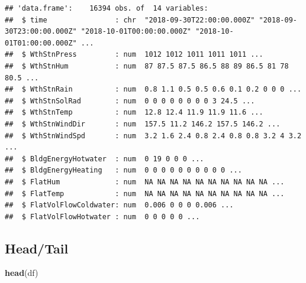 \documentclass[
]{book}
\newenvironment{Shaded}{\begin{snugshade}}{\end{snugshade}}
\newcommand{\KeywordTok}[1]{\textcolor[rgb]{0.13,0.29,0.53}{\textbf{#1}}}
\newcommand{\NormalTok}[1]{#1}
\begin{document}
\begin{verbatim}
## 'data.frame':    16394 obs. of  14 variables:
##  $ time                : chr  "2018-09-30T22:00:00.000Z" "2018-09-30T23:00:00.000Z" "2018-10-01T00:00:00.000Z" "2018-10-01T01:00:00.000Z" ...
##  $ WthStnPress         : num  1012 1012 1011 1011 1011 ...
##  $ WthStnHum           : num  87 87.5 87.5 86.5 88 89 86.5 81 78 80.5 ...
##  $ WthStnRain          : num  0.8 1.1 0.5 0.5 0.6 0.1 0.2 0 0 0 ...
##  $ WthStnSolRad        : num  0 0 0 0 0 0 0 0 3 24.5 ...
##  $ WthStnTemp          : num  12.8 12.4 11.9 11.9 11.6 ...
##  $ WthStnWindDir       : num  157.5 11.2 146.2 157.5 146.2 ...
##  $ WthStnWindSpd       : num  3.2 1.6 2.4 0.8 2.4 0.8 0.8 3.2 4 3.2 ...
##  $ BldgEnergyHotwater  : num  0 19 0 0 0 ...
##  $ BldgEnergyHeating   : num  0 0 0 0 0 0 0 0 0 0 ...
##  $ FlatHum             : num  NA NA NA NA NA NA NA NA NA NA ...
##  $ FlatTemp            : num  NA NA NA NA NA NA NA NA NA NA ...
##  $ FlatVolFlowColdwater: num  0.006 0 0 0 0.006 ...
##  $ FlatVolFlowHotwater : num  0 0 0 0 0 ...
\end{verbatim}

\hypertarget{headtail}{%
\subsection{Head/Tail}\label{headtail}}

\begin{Shaded}
\begin{Highlighting}[]
\KeywordTok{head}\NormalTok{(df)}
\end{Highlighting}
\end{Shaded}
\end{document}
